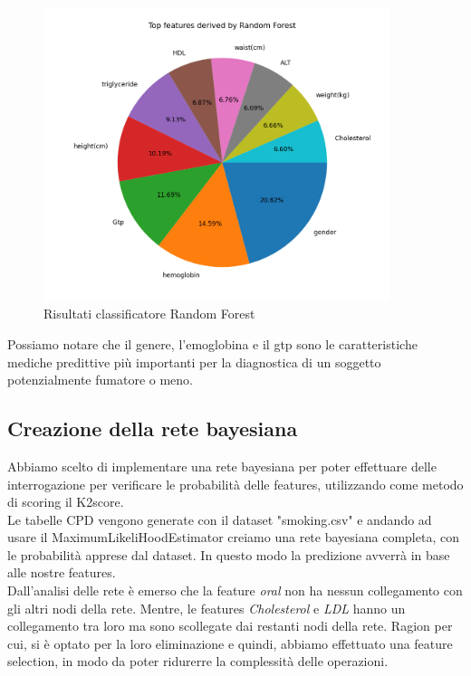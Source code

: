 \documentclass{article}
\begin{document}
\begin{figure}[H]
        \includegraphics[width=0.9\textwidth]{Grafico3}
        \centering
        \caption{Risultati classificatore Random Forest}
        \centering
\end{figure}
%

\noindent
Possiamo notare che il genere, l'emoglobina e il gtp
sono le caratteristiche mediche predittive più importanti per la diagnostica di un soggetto potenzialmente fumatore o meno.

\subsection{Creazione della rete bayesiana}
Abbiamo scelto di implementare una rete bayesiana per poter effettuare delle interrogazione per
verificare le probabilità delle features, utilizzando come metodo di scoring il K2score.\\ 
Le tabelle CPD vengono generate con il dataset "smoking.csv" e andando ad usare il
MaximumLikeliHoodEstimator creiamo una rete bayesiana completa, con le probabilità apprese dal
dataset. In questo modo la predizione avverrà in base alle nostre features.\\
Dall'analisi delle rete è emerso che la feature \textit{oral} non ha nessun collegamento con gli altri nodi della rete. Mentre, le features \textit{Cholesterol} e \textit{LDL} hanno un collegamento tra loro ma sono scollegate dai restanti nodi della rete. Ragion per cui, si è optato per la loro eliminazione  e quindi, abbiamo effettuato una feature selection, in modo da poter ridurerre la complessità delle operazioni.
%
\end{document}

